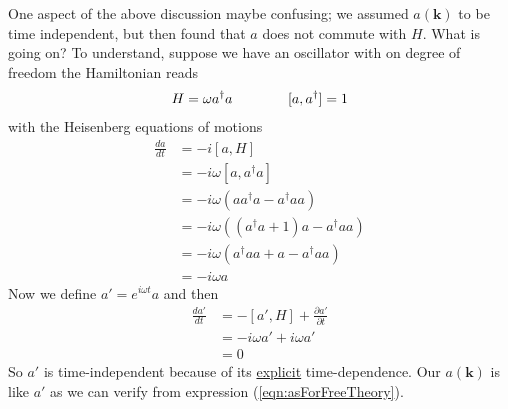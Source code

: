 \documentclass{article}
\begin{document}
One aspect of the above discussion maybe confusing; we assumed $a(\mathbf{k})$ to be time independent, but then found that $a$ does not commute with $H$. What is going on?
To understand, suppose we have an oscillator with on degree of freedom the Hamiltonian reads
\begin{align}
H=\omega a^\dagger a\qquad\qquad\text[a,a^\dagger]=1
\end{align}
with the Heisenberg equations of motions
\begin{align}
\frac{da}{dt}
&=-i[a,H]\\
&=-i\omega[a,a^\dagger a]\\
&=-i\omega(aa^\dagger a-a^\dagger a a)\\
&=-i\omega((a^\dagger a+1)a-a^\dagger a a)\\
&=-i\omega(a^\dagger a a+a-a^\dagger a a)\\
&=-i\omega a
\end{align}
Now we define $a'=e^{i\omega t}a$ and then
\begin{align}
\frac{da'}{dt}
&=-[a',H]+\frac{\partial a'}{\partial t}\\
&=-i\omega a'+i\omega a'\\
&=0
\end{align}
So $a'$ is time-independent because of its \underline{explicit} time-dependence. Our $a(\mathbf{k})$ is like $a'$ as we can verify from expression (\ref{eqn:asForFreeTheory}).
\end{document}
